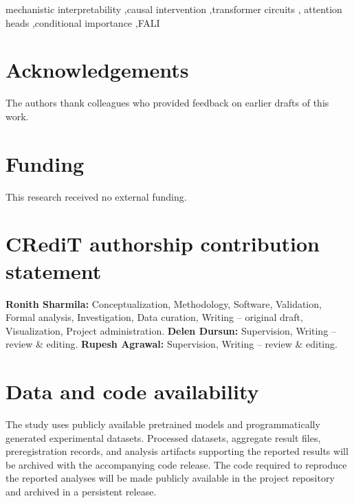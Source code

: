 \documentclass[preprint,12pt,authoryear]{elsarticle}
\begin{document}
\begin{frontmatter}
\begin{graphicalabstract}
\end{graphicalabstract}

\begin{highlights}

\end{highlights}

\begin{keyword}
mechanistic interpretability \sep causal intervention \sep transformer circuits \sep
attention heads \sep conditional importance \sep FALI
\end{keyword}

\end{frontmatter}













\section*{Acknowledgements}
The authors thank colleagues who provided feedback on earlier drafts of this work.

\section*{Funding}
This research received no external funding.

\section*{CRediT authorship contribution statement}
\textbf{Ronith Sharmila:} Conceptualization, Methodology, Software, Validation, Formal analysis, Investigation, Data curation, Writing -- original draft, Visualization, Project administration.
\textbf{Delen Dursun:} Supervision, Writing -- review \& editing.
\textbf{Rupesh Agrawal:} Supervision, Writing -- review \& editing.

\section*{Data and code availability}
The study uses publicly available pretrained models and programmatically generated experimental datasets. Processed datasets, aggregate result files, preregistration records, and analysis artifacts supporting the reported results will be archived with the accompanying code release. The code required to reproduce the reported analyses will be made publicly available in the project repository and archived in a persistent release.
\end{document}
